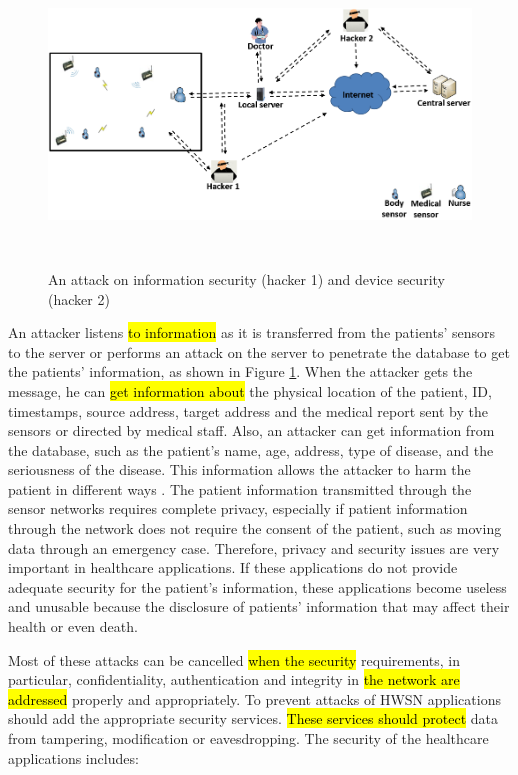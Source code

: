 \documentclass[a4paper,11pt]{article}
\DeclareRobustCommand{\hlyellow}[1]{{\sethlcolor{white}\hl{#1}}}
\begin{document}
\begin{figure}[t]
	\centering
		\includegraphics[width=15cm,height=8cm]{pic/hackeav.png}
	\caption{An attack on information security (hacker 1) and device security (hacker 2)}
	\label{fig:hackeav}
\end{figure}

An attacker listens \hlyellow{to information} as it is transferred from the patients' sensors to the server or performs an attack on the server to penetrate the database to get the patients' information, as shown in Figure \ref{fig:hackeav}. When the attacker gets the message, he can \hlyellow{get information about} the physical location of the patient, ID, timestamps, source address, target address and the medical report sent by the sensors or directed by medical staff. Also, an attacker can get information from the database, such as the patient's name, age, address, type of disease, and the seriousness of the disease. This information allows the attacker to harm the patient in different ways \cite{pr1}. The patient information transmitted through the sensor networks requires complete privacy, especially if patient information through the network does not require the consent of the patient, such as moving data through an emergency case. Therefore, privacy and security issues are very important in healthcare applications. If these applications do not provide adequate security for the patient's information, these applications become useless and unusable because the disclosure of patients' information that may affect their health or even death.

Most of these attacks can be cancelled \hlyellow{when the security} requirements, in particular, confidentiality, authentication and integrity in \hlyellow{the network are addressed} properly and appropriately. To prevent attacks of HWSN applications should add the appropriate security services. \hlyellow{These services should protect} data from tampering, modification or eavesdropping. The security of the healthcare applications includes:
\end{document}
